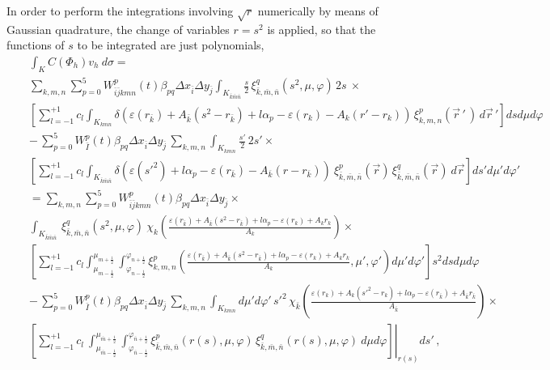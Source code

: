 \documentclass[11pt]{article}
\newcommand{\eps}{\varepsilon}
\newcommand{\cd}[1]{c_{#1}}
\newcommand{\alp}{\alpha_{p}}
\newcommand{\ib}{\bar{i}} %
\newcommand{\jb}{\bar{j}} %
\newcommand{\kb}{\bar{k}} %
\newcommand{\mb}{\bar{m}} %
\newcommand{\nb}{\bar{n}} %
\begin{document}
In order to perform the integrations involving $\sqrt{r}$ numerically by means of Gaussian quadrature,
the change of variables $r = s^2$ is applied, so that the functions of $s$ to be integrated
are just polynomials, 
\begin{eqnarray}
& & \int_K C(\Phi_h) v_h \: d\sigma =  \nonumber\\
& & 
\sum_{k,m,n} \sum_{p=0}^{5} 
W_{\ib \jb kmn}^p(t) \beta_{p q} \Delta x_{\ib} \Delta y_{\jb}  
\int_{K_{\kb \mb \nb}} 
\frac{s}{2}  \,
\xi^{q}_{\kb,\mb,\nb}(s^2,\mu,\varphi) \,  2s  \:
\times 
\nonumber \\
& & 
\left[ 
\sum_{l=-1}^{+1} \cd{l} \int_{K_{k m n}} 
\delta( \eps(r_{\kb}) + A_{\kb}(s^2 - r_{\kb} ) + l \alp - \eps(r_k) - A_k (r' - r_k) ) \, \xi^{p}_{k,m,n}(\vec{r}\,'\,) \,
d\vec{r}\,' \right] ds d\mu d\varphi 
\nonumber\\
&  & - \,
\sum_{p=0}^{5} W_{{\bar{I}}}^p(t)
 \beta_{p q}  \Delta x_{\ib}  \Delta y_{\jb} \,
\sum_{k,m,n} 
\int_{K_{k m n}} \! 
\frac{{s'}}{2} \, 2s'
\times \nonumber \\
& & 
\left[ 
\sum_{l=-1}^{+1} \cd{l}
\int_{K_{\kb \mb \nb}} \!
\delta( \eps(s'^2) + l \alp - \eps(r_{\kb}) - A_{\kb} (r - r_{\kb})  ) \: 
\xi^{p}_{\kb,\mb,\nb}(\vec{r}) \,
\xi^{q}_{\kb,\mb,\nb}(\vec{r}) \:
d\vec{r}  
\right] \! 
ds'  d\mu'  d\varphi' 
\nonumber \\
& &  =
\sum_{k,m,n} \sum_{p=0}^{5} 
W_{\ib \jb kmn}^p(t) \beta_{p q} \Delta x_{\ib} \Delta y_{\jb} \times 
\\
&&   
\int_{K_{\kb \mb \nb}} 
 \,
\xi^{q}_{\kb,\mb,\nb}(s^2,\mu,\varphi)  \:
\chi_{k}\left(\frac{\eps(r_{\kb}) + A_{\kb}(s^2 - r_{\kb} ) + l \alp - \eps(r_k) + A_k r_k }{A_k}\right)
\times 
\nonumber \\
& & 
\left[ 
\sum_{l=-1}^{+1} \cd{l} %
\int_{\mu_{m-\frac{1}{2}}}^{\mu_{m+\frac{1}{2}}} \int_{\varphi_{n-\frac{1}{2}}}^{\varphi_{n+\frac{1}{2}}}
\xi^{p}_{k,m,n}\left( \frac{\eps(r_{\kb}) + A_{\kb}(s^2 - r_{\kb} ) + l \alp - \eps(r_k) + A_k r_k }{A_k} ,\mu',\varphi' \right) d\mu' d\varphi' 
\right] 
{s^2} 
ds d\mu d\varphi 
\nonumber\\
&  & - \,
\sum_{p=0}^{5} W_{{\bar{I}}}^p(t)
 \beta_{p q}  \Delta x_{\ib}  \Delta y_{\jb} \,
\sum_{k,m,n} 
\int_{K_{k m n}} \! 
d\mu'  d\varphi' \,
{{s'}^2} \,
\chi_{\kb}\left( \frac{ \eps(r_k) + A_k(s'^2 - r_k) + l \alp - \eps(r_{\kb}) + A_{\kb} r_{\kb} }{A_{\kb}}\right)
\times
\nonumber \\
& & 
\left.
\left[ 
\sum_{l=-1}^{+1} \cd{l} \: 
\int_{\mu_{\mb - \frac{1}{2}}}^{\mu_{\mb + \frac{1}{2}}} \int_{\varphi_{\nb - \frac{1}{2}}}^{\varphi_{\nb + \frac{1}{2}}}
\xi^{p}_{\kb,\mb,\nb}(r(s),\mu,\varphi) \,
\xi^{q}_{\kb,\mb,\nb}(r(s),\mu,\varphi) \:
d\mu d\varphi  
\right] \! 
\right|_{r(s)} ds'   \, ,
\nonumber 
\end{eqnarray}
\end{document}
